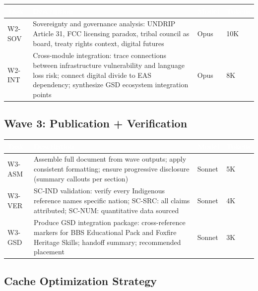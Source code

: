 \documentclass[11pt,letterpaper]{article}
\newcommand{\tableheader}[1]{\textbf{\sffamily\textcolor{white}{#1}}}
\begin{document}
\begin{center}
\begin{tabularx}{\textwidth}{L{3cm}XC{1.8cm}C{1.8cm}}
\toprule
{}
\tableheader{Task} & \tableheader{Description} & \tableheader{Model} & \tableheader{Tokens} \\
\midrule
W2-SOV & Sovereignty and governance analysis: UNDRIP Article 31, FCC licensing paradox, tribal council as board, treaty rights context, digital futures & Opus & 10K \\
W2-INT & Cross-module integration: trace connections between infrastructure vulnerability and language loss risk; connect digital divide to EAS dependency; synthesize GSD ecosystem integration points & Opus & 8K \\
\bottomrule
\end{tabularx}
\end{center}

\subsection{Wave 3: Publication + Verification}

\begin{center}
\begin{tabularx}{\textwidth}{L{3cm}XC{1.8cm}C{1.8cm}}
\toprule
{}
\tableheader{Task} & \tableheader{Description} & \tableheader{Model} & \tableheader{Tokens} \\
\midrule
W3-ASM & Assemble full document from wave outputs; apply consistent formatting; ensure progressive disclosure (summary callouts per section) & Sonnet & 5K \\
W3-VER & SC-IND validation: verify every Indigenous reference names specific nation; SC-SRC: all claims attributed; SC-NUM: quantitative data sourced & Sonnet & 4K \\
W3-GSD & Produce GSD integration package: cross-reference markers for BBS Educational Pack and Foxfire Heritage Skills; handoff summary; recommended placement & Sonnet & 3K \\
\bottomrule
\end{tabularx}
\end{center}

\subsection{Cache Optimization Strategy}
\end{document}
